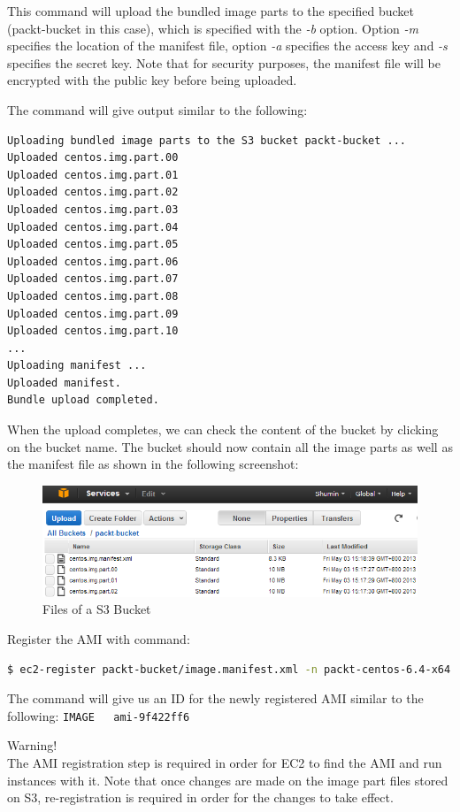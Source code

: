 This command will upload the bundled image parts to the specified bucket (packt-bucket in this case), which is specified with the \emph{-b} option. Option \emph{-m} specifies the location of the manifest file, option \emph{-a} specifies the access key and \emph{-s} specifies the secret key. Note that for security purposes, the manifest file will be encrypted with the public key before being uploaded.

The command will give output similar to the following:
\lstset{style=bashstyle}
\begin{lstlisting}
Uploading bundled image parts to the S3 bucket packt-bucket ...
Uploaded centos.img.part.00
Uploaded centos.img.part.01
Uploaded centos.img.part.02
Uploaded centos.img.part.03
Uploaded centos.img.part.04
Uploaded centos.img.part.05
Uploaded centos.img.part.06
Uploaded centos.img.part.07
Uploaded centos.img.part.08
Uploaded centos.img.part.09
Uploaded centos.img.part.10
...
Uploading manifest ...
Uploaded manifest.
Bundle upload completed.
\end{lstlisting}

When the upload completes, we can check the content of the bucket by clicking on the bucket name. The bucket should now contain all the image parts as well as the manifest file as shown in the following screenshot:
\begin{figure}[ht]
  \centering
  \includegraphics[width=.8\textwidth]{figs/5163os_08_20.png}
  \caption{Files of a S3 Bucket}\label{fig:aws.bucket.content}
\end{figure} 
Register the AMI with command:
\lstset{style=bashstyle}
\begin{lstlisting}[language=bash]
$ ec2-register packt-bucket/image.manifest.xml -n packt-centos-6.4-x64 -O AKIAJ7GAQT52MZKJA4WQ -W QDHHZ0/Mj5pDYFWKpqEzXhwjqM1UB+cqjGQQ6l3S
\end{lstlisting}

The command will give us an ID for the newly registered AMI similar to the following:
\verb|IMAGE   ami-9f422ff6|
\begin{warning}
Warning!\\
The AMI registration step is required in order for EC2 to find the AMI and run instances with it. Note that once changes are made on the image part files stored on S3, re-registration is required in order for the changes to take effect.
\end{warning}

